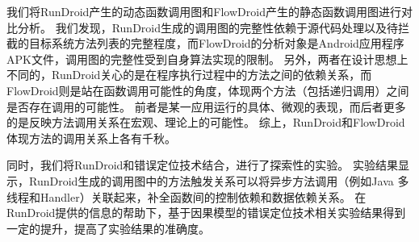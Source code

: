 我们将RunDroid产生的动态函数调用图和FlowDroid产生的静态函数调用图进行对比分析。
我们发现，RunDroid生成的调用图的完整性依赖于源代码处理以及待拦截的目标系统方法列表的完整程度，而FlowDroid的分析对象是Android应用程序APK文件，调用图的完整性受到自身算法实现的限制。
另外，两者在设计思想上不同的，RunDroid关心的是在程序执行过程中的方法之间的依赖关系，而FlowDroid则是站在函数调用可能性的角度，体现两个方法（包括递归调用）之间是否存在调用的可能性。
前者是某一应用运行的具体、微观的表现，而后者更多的是反映方法调用关系在宏观、理论上的可能性。
综上，RunDroid和FlowDroid体现方法的调用关系上各有千秋。


同时，我们将RunDroid和错误定位技术结合，进行了探索性的实验。
实验结果显示，RunDroid生成的调用图中的方法触发关系可以将异步方法调用（例如Java 多线程和Handler）关联起来，补全函数间的控制依赖和数据依赖关系。
在RunDroid提供的信息的帮助下，基于因果模型的错误定位技术相关实验结果得到一定的提升，提高了实验结果的准确度。
